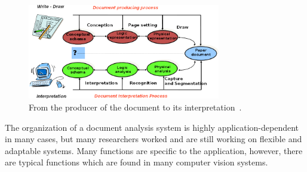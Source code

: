     \begin{figure}%
      \centering
      \includegraphics[trim= 0mm 0mm 0mm 0mm, clip, width=0.75\textwidth]{document_interpretation.png}
    \caption[From the producer of the document to its interpretation]{From the producer of the document to its interpretation~\cite{Lamiroy2014Handbook}.}
    \label{fig:sota:document_interpretation}
    \end{figure}

The organization of a document analysis system is highly application-dependent in many cases, but many researchers worked and are still working on flexible and adaptable systems.
Many functions are specific to the application, however, there are typical functions which are found in many computer vision systems.

